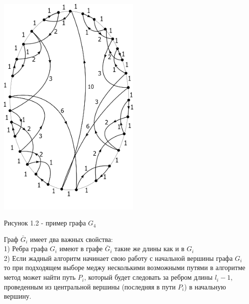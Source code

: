 \documentclass[a4paper, 14pt]{extarticle}
\numberwithin{equation}{section}
\begin{document}
\begin{center}
\includegraphics[width=200pt]{ris2.png}
\end{center}

\begin{center}
Рисунок 1.2 - пример графа $G_4$
\end{center}


Граф $\bar G_i$ имеет два важных свойства:\\
1) Ребра графа $G_i$ имеют в графе $\bar G_i$ такие же длины как и в $G_i$ \\
2) Если жадный алгоритм начинает свою работу с начальной вершины графа  $G_i$ то при подходящем выборе меджу несколькими возможными путями в алгоритме метод может найти путь $P_i$, который будет следовать за ребром длины $l_i-1$, проведенным из центральной вершины (последняя в пути $P_i$) в начальную вершину.
\end{document}
